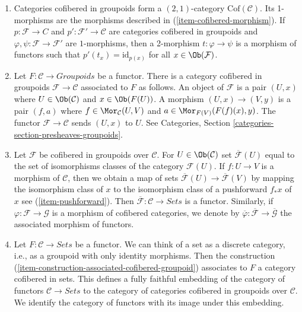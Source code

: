\begin{remarks}
\begin{enumerate}
\item
\label{item-definition-cofibered-groupoids-2-category}
Categories cofibered in groupoids form a $(2, 1)$-category
$\text{Cof}(\mathcal{C})$. Its 1-morphisms are the morphisms described in
(\ref{item-cofibered-morphism}). If $p: \mathcal{F} \to C$ and
$p': \mathcal{F}' \to \mathcal{C}$ are categories cofibered in groupoids
and $\varphi, \psi: \mathcal{F} \to \mathcal{F}'$ are $1$-morphisms, then
a 2-morphism $t: \varphi \to \psi$ is a morphism of functors such that
$p'(t_x) = \text{id}_{p(x)}$ for all $x \in \Ob(\mathcal{F})$.
\item
\label{item-construction-associated-cofibered-groupoid}
Let $F : \mathcal{C} \to \textit{Groupoids}$ be a functor. There
is a category cofibered in groupoids $\mathcal{F} \to \mathcal{C}$
associated to $F$ as follows. An object of $\mathcal{F}$ is a pair $(U, x)$
where $U \in \Ob(\mathcal{C})$ and $x \in \Ob(F(U))$. A
morphism $(U, x) \to (V, y)$ is a pair $(f, a)$ where
$f \in \Mor_\mathcal{C}(U, V)$ and
$a \in \Mor_{F(V)}(F(f)(x), y)$.
The functor $\mathcal{F} \to \mathcal{C}$ sends $(U, x)$ to $U$. See
Categories, Section \ref{categories-section-presheaves-groupoids}.
\item
\label{item-associated-functor-isomorphism-classes}
Let $\mathcal{F}$ be cofibered in groupoids over $\mathcal{C}$.
For $U \in \Ob(\mathcal{C})$ set $\overline{\mathcal{F}}(U)$ equal to
the set of isomorphisms classes of the category $\mathcal{F}(U)$.
If $f : U \to V$ is a morphism of $\mathcal{C}$, then we obtain a
map of sets $\overline{\mathcal{F}}(U) \to \overline{\mathcal{F}}(V)$ by
mapping the isomorphism class of $x$ to the isomorphism class of a pushforward
$f_*x$ of $x$ see (\ref{item-pushforward}). Then
$\overline{\mathcal{F}} : \mathcal{C} \to \textit{Sets}$ is a
functor. Similarly, if $\varphi: \mathcal{F} \to \mathcal{G}$ is a
morphism of cofibered categories, we denote by
$\overline{\varphi}: \overline{\mathcal{F}} \to  \overline{\mathcal{G}}$
the associated morphism of functors.
\item
\label{item-convention-cofibered-sets}
Let $F: \mathcal{C} \to \textit{Sets}$ be a functor. We can think of a
set as a discrete category, i.e., as a groupoid with only identity morphisms.
Then the construction (\ref{item-construction-associated-cofibered-groupoid})
associates to $F$ a category cofibered in sets. This defines a fully
faithful embedding of the category of functors $\mathcal{C} \to \textit{Sets}$
to the category of categories cofibered in groupoids over $\mathcal{C}$.
We identify the category of functors with its image under this embedding.

\end{enumerate}
\end{remarks}
